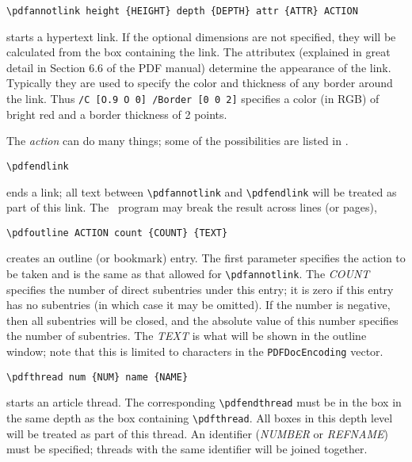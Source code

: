 \begin{verbatim}
\pdfannotlink height {HEIGHT} depth {DEPTH} attr {ATTR} ACTION 
\end{verbatim}

starts a hypertext link. If the optional dimensions are not specified, they will be 
calculated from the box containing the link. The attributex (explained in great detail 
in Section 6.6 of the PDF manual) determine the appearance of the link. Typically 
they are used to specify the color and thickness of any border around the link. 
Thus \verb|/C [O.9 O 0] /Border [0 0 2]| specifies a color (in RGB) of bright red 
and a border thickness of 2 points. 

The \emph{action} can do many things; some of the possibilities are listed in . 

\begin{verbatim}
\pdfendlink 
\end{verbatim}

ends a link; all text between \verb|\pdfannotlink| and \verb|\pdfendlink| will be treated as 
part of this link. The \pdfTEX\  program may break the result across lines (or pages), 
 

\begin{verbatim}
\pdfoutline ACTION count {COUNT} {TEXT} 
\end{verbatim}

creates an outline (or bookmark) entry. The first parameter specifies
the action to be taken and is the same as that allowed for
\verb|\pdfannotlink|. The \emph{COUNT} specifies the number of direct
subentries under this entry; it is zero if this entry has no subentries
(in which case it may be omitted). If the number is negative, then all
subentries will be closed, and the absolute value of this number
specifies the number of subentries.  The \emph{TEXT} is what will be
shown in the outline window; note that this is limited to characters in
the \verb|PDFDocEncoding| vector. 


\begin{verbatim}
\pdfthread num {NUM} name {NAME} 
\end{verbatim}

starts an article thread. The corresponding \verb|\pdfendthread| must be in the box in 
the same depth as the box containing \verb|\pdfthread|. All boxes in this depth level will 
be treated as part of this thread. An identifier (\emph{NUMBER} or
\emph{REFNAME}) must be specified; 
threads with the same identifier will be joined together. 

